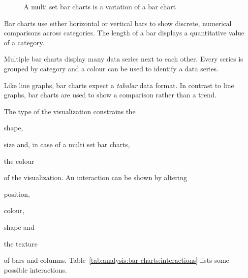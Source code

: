 \begin{figure}
  \begin{center}
    \qquad
  \end{center}
  \caption{A multi set bar charts is a variation of a bar chart}
  \label{fig:analysis:bar-charts}
\end{figure}

Bar charts use either horizontal or vertical bars to show discrete, numerical comparisons across categories.
The length of a bar displays a quantitative value of a category.

Multiple bar charts display many data series next to each other.
Every series is grouped by category and a colour can be used to identify a data series.

Like line graphs, bar charts expect a \emph{tabular} data format.
In contrast to line graphs, bar charts are used to show a comparison rather than a trend.

The type of the visualization constrains the
\begin{enumerate*}[label=(\arabic*)]
    \item shape,
    \item size and, in case of a multi set bar charts,
    \item the colour
\end{enumerate*}
of the visualization.
An interaction can be shown by altering
\begin{enumerate*}[label=(\arabic*)]
    \item position,
    \item colour,
    \item shape and
    \item the texture
\end{enumerate*}
of bars and columns.
Table~\ref{tab:analysis:bar-charts:interactions} lists some possible interactions.


